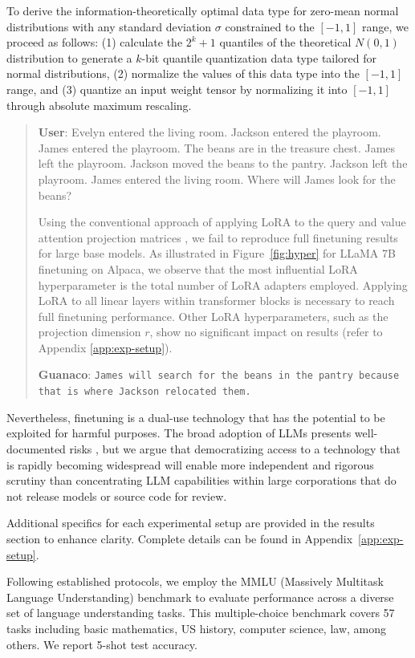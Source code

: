 To derive the information-theoretically optimal data type for zero-mean normal distributions with any standard deviation $\sigma$ constrained to the $[-1, 1]$ range, we proceed as follows: (1) calculate the $2^k+1$ quantiles of the theoretical $N(0, 1)$ distribution to generate a $k$-bit quantile quantization data type tailored for normal distributions, (2) normalize the values of this data type into the $[-1, 1]$ range, and (3) quantize an input weight tensor by normalizing it into $[-1, 1]$ through absolute maximum rescaling.

\begin{quote}
    \textbf{User}: Evelyn entered the living room. Jackson entered the playroom. James entered the playroom. The beans are in the treasure chest. James left the playroom. Jackson moved the beans to the pantry. Jackson left the playroom. James entered the living room. Where will James look for the beans?

Using the conventional approach of applying LoRA to the query and value attention projection matrices \citep{hu2021lora}, we fail to reproduce full finetuning results for large base models. As illustrated in Figure~\ref{fig:hyper} for LLaMA 7B finetuning on Alpaca, we observe that the most influential LoRA hyperparameter is the total number of LoRA adapters employed. Applying LoRA to all linear layers within transformer blocks is necessary to reach full finetuning performance. Other LoRA hyperparameters, such as the projection dimension $r$, show no significant impact on results (refer to Appendix \ref{app:exp-setup}).

    \textbf{Guanaco}: \texttt{James will search for the beans in the pantry because that is where Jackson relocated them.}
\end{quote}

Nevertheless, finetuning is a dual-use technology that has the potential to be exploited for harmful purposes. The broad adoption of LLMs presents well-documented risks \citep{bommasani2021opportunities,bender2021dangers}, but we argue that democratizing access to a technology that is rapidly becoming widespread will enable more independent and rigorous scrutiny than concentrating LLM capabilities within large corporations that do not release models or source code for review.

Additional specifics for each experimental setup are provided in the results section to enhance clarity. Complete details can be found in Appendix~\ref{app:exp-setup}.

Following established protocols, we employ the MMLU (Massively Multitask Language Understanding) benchmark \citep{hendrycksmeasuring} to evaluate performance across a diverse set of language understanding tasks. This multiple-choice benchmark covers 57 tasks including basic mathematics, US history, computer science, law, among others. We report 5-shot test accuracy.

